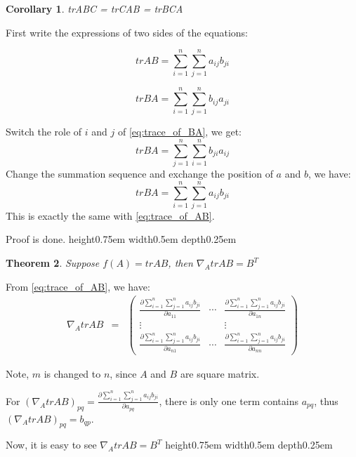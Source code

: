 \documentclass[a4paper]{article}
\newtheorem{theorem}{Theorem}[section]
\newtheorem{corollary}[theorem]{Corollary}
\newenvironment{proof}[1][Proof]{\begin{trivlist}
\item[\hskip \labelsep {\bfseries #1}]}{\end{trivlist}}
\newcommand{\qed}{\nobreak \ifvmode \relax \else
      \ifdim\lastskip<1.5em \hskip-\lastskip
      \hskip1.5em plus0em minus0.5em \fi \nobreak
      \vrule height0.75em width0.5em depth0.25em\fi}
\begin{document}
\begin{corollary}
	trABC = trCAB = trBCA
\end{corollary}

\begin{proof}
	First write the expressions of two sides of the equations:


	\begin{equation}
		trAB = \sum\limits^{n}_{i=1}\sum\limits^{n}_{j=1}a_{ij}b_{ji}
		\label{eq:trace_of_AB}
	\end{equation}

	\begin{equation}
		trBA = \sum\limits^{n}_{i=1}\sum\limits^{n}_{j=1}b_{ij}a_{ji}
		\label{eq:trace_of_BA}
	\end{equation}

	Switch the role of $i$ and $j$ of \cref{eq:trace_of_BA}, we get:
	\begin{displaymath}
		trBA = \sum\limits^{n}_{j=1}\sum\limits^{n}_{i=1}b_{ji}a_{ij}
	\end{displaymath}
	Change the summation sequence and exchange the position of $a$ and
	$b$, we have:
	\begin{displaymath}
		trBA = \sum\limits^{n}_{i=1}\sum\limits^{n}_{j=1}a_{ij}b_{ji}
	\end{displaymath}
	This is exactly the same with \cref{eq:trace_of_AB}.

	Proof is done.\qed
\end{proof}

\begin{theorem}
	Suppose $f(A) = trAB$, then $\nabla_A trAB = B^T$
	\label{thm:trAB_=_B^T}
\end{theorem}

\begin{proof}
	From \cref{eq:trace_of_AB}, we have:
	\begin{eqnarray}
		\nabla_AtrAB & = &
		\begin{pmatrix}
			\frac{\partial \sum\limits^{n}_{i=1}\sum\limits^{n}_{j=1}a_{ij}b_{ji}}{\partial a_{11}} & \cdots & \frac{\partial \sum\limits^{n}_{i=1}\sum\limits^{n}_{j=1}a_{ij}b_{ji}}{\partial a_{1n}}\\
			\vdots &  & \vdots\\
			\frac{\partial \sum\limits^{n}_{i=1}\sum\limits^{n}_{j=1}a_{ij}b_{ji}}{\partial a_{n1}} & \cdots & \frac{\partial \sum\limits^{n}_{i=1}\sum\limits^{n}_{j=1}a_{ij}b_{ji}}{\partial a_{nn}}
		\end{pmatrix}
		\label{eq:nabla_trace_AB}
	\end{eqnarray}

	Note, $m$ is changed to $n$, since $A$ and $B$ are square matrix.

	For $(\nabla_AtrAB)_{pq} = \frac{\partial
	\sum\limits^{n}_{i=1}\sum\limits^{n}_{j=1}a_{ij}b_{ji}}{\partial
	a_{pq}}$, there is only one term contains $a_{pq}$,
	thus $(\nabla_AtrAB)_{pq} = b_{qp}$.

	Now, it is easy to see $\nabla_AtrAB = B^T$\qed

\end{proof}
\end{document}

